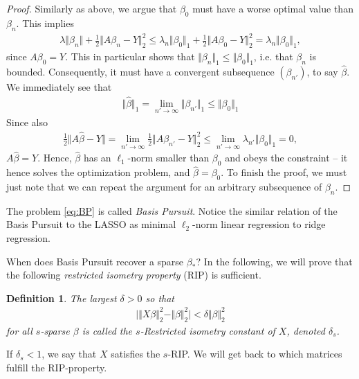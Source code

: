 \documentclass{article}
\newtheorem{defi}{Definition}
\newcommand{\abs}[1]{\vert #1 \vert}
\newcommand{\norm}[1]{\Vert #1 \Vert}
\begin{document}
\begin{proof}
    Similarly as above, we argue that $\beta_0$ must have a worse optimal value than $\beta_n$. This implies
    \begin{align*}
        \lambda \norm{\beta_n} + \tfrac{1}{2}\norm{A\beta_n- Y}_2^2 \leq \lambda_n \norm{\beta_0}_1 +\tfrac{1}{2}\norm{A\beta_0- Y}_2^2 = \lambda_n\norm{\beta_0}_1,
    \end{align*}
    since $A\beta_0 = Y$. This in particular shows that $\norm{\beta_n}_1 \leq \norm{\beta_0}_1$, i.e. that $\beta_n$ is bounded. Consequently, it must have a convergent subsequence $(\beta_{n'})$, to say $\hat{\beta}$. We immediately see that 
    \begin{align*}
        \norm{\hat{\beta}}_1 = \lim_{n'\to \infty }\norm{\beta_{n'}}_1 \leq \norm{\beta_0}_1
    \end{align*}
    Since also
    \begin{align*}
        \tfrac{1}{2}\norm{A\hat{\beta}-Y} = \lim_{n'\to \infty} \tfrac{1}{2}\norm{A\beta_{n'}- Y}_2^2 \leq \lim_{n'\to\infty}\lambda_{n'} \norm{\beta_0}_1 = 0,
    \end{align*}
    $A\hat{\beta}=Y$. Hence, $\hat{\beta}$ has an $\ell_1$-norm smaller than $\beta_0$ and obeys the constraint -- it hence solves the optimization problem, and $\hat{\beta}=\beta_0$. To finish the proof, we must just note that we can repeat the argument for an arbitrary subsequence of $\beta_n$.
   
\end{proof}

The problem \ref{eq:BP} is called \emph{Basis Pursuit}. Notice the similar relation of the Basis Pursuit to the LASSO as minimal $\ell_2$-norm linear regression to ridge regression.

When does Basis Pursuit recover a sparse $\beta_*$? In the following, we will prove that the following \emph{restricted isometry property} (RIP) is sufficient.
\begin{defi}
    The largest $\delta>0$ so that
    \begin{align*}
        \abs{\norm{X\beta}_2^2 - \norm{\beta}_2^2}< \delta\norm{\beta}_2^2
    \end{align*}
    for all $s$-sparse $\beta$ is called the $s$-Restricted isometry constant of $X$, denoted $\delta_s$. 
\end{defi}
If $\delta_s<1$, we say that $X$ satisfies the $s$-RIP. We will get back to which matrices fulfill the RIP-property.
\end{document}
